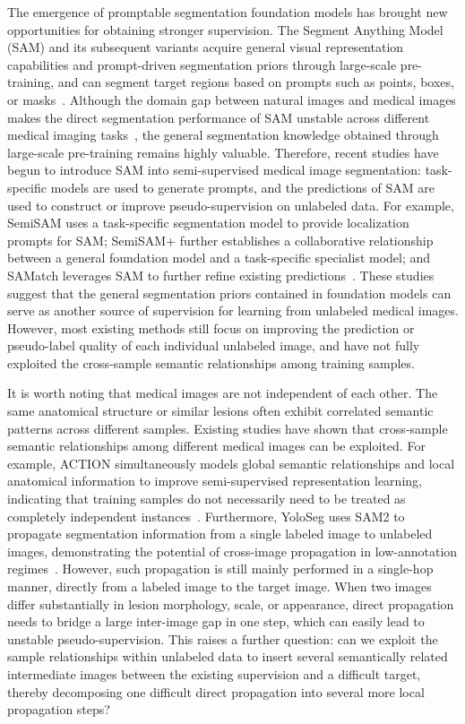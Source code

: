 \documentclass[a4paper,fleqn]{cas-dc}
\begin{document}
The emergence of promptable segmentation foundation models has brought new opportunities for obtaining stronger supervision. The Segment Anything Model (SAM) and its subsequent variants acquire general visual representation capabilities and prompt-driven segmentation priors through large-scale pre-training, and can segment target regions based on prompts such as points, boxes, or masks~\cite{kirillov2023segment}. Although the domain gap between natural images and medical images makes the direct segmentation performance of SAM unstable across different medical imaging tasks~\cite{mazurowski2023samexperiment,ma2024medsam}, the general segmentation knowledge obtained through large-scale pre-training remains highly valuable. Therefore, recent studies have begun to introduce SAM into semi-supervised medical image segmentation: task-specific models are used to generate prompts, and the predictions of SAM are used to construct or improve pseudo-supervision on unlabeled data. For example, SemiSAM uses a task-specific segmentation model to provide localization prompts for SAM; SemiSAM+ further establishes a collaborative relationship between a general foundation model and a task-specific specialist model; and SAMatch leverages SAM to further refine existing predictions~\cite{zhang2023semisam,zhang2025semisamplus,xu2024samatch}. These studies suggest that the general segmentation priors contained in foundation models can serve as another source of supervision for learning from unlabeled medical images. However, most existing methods still focus on improving the prediction or pseudo-label quality of each individual unlabeled image, and have not fully exploited the cross-sample semantic relationships among training samples.

It is worth noting that medical images are not independent of each other. The same anatomical structure or similar lesions often exhibit correlated semantic patterns across different samples. Existing studies have shown that cross-sample semantic relationships among different medical images can be exploited. For example, ACTION simultaneously models global semantic relationships and local anatomical information to improve semi-supervised representation learning, indicating that training samples do not necessarily need to be treated as completely independent instances~\cite{you2022action}. Furthermore, YoloSeg uses SAM2 to propagate segmentation information from a single labeled image to unlabeled images, demonstrating the potential of cross-image propagation in low-annotation regimes~\cite{zhang2026yoloseg}. However, such propagation is still mainly performed in a single-hop manner, directly from a labeled image to the target image. When two images differ substantially in lesion morphology, scale, or appearance, direct propagation needs to bridge a large inter-image gap in one step, which can easily lead to unstable pseudo-supervision. This raises a further question: can we exploit the sample relationships within unlabeled data to insert several semantically related intermediate images between the existing supervision and a difficult target, thereby decomposing one difficult direct propagation into several more local propagation steps?
\end{document}
